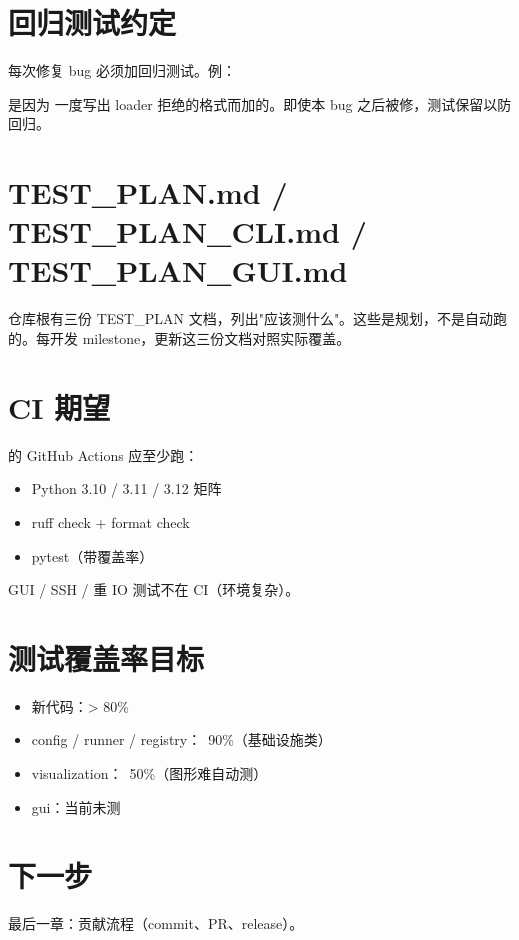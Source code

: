 \section{回归测试约定}

每次修复 bug 必须加回归测试。例：

 是因为  一度写出 loader 拒绝的格式而加的。即使本 bug 之后被修，测试保留以防回归。

\section{TEST\_PLAN.md / TEST\_PLAN\_CLI.md / TEST\_PLAN\_GUI.md}

仓库根有三份 TEST\_PLAN 文档，列出"应该测什么"。这些是规划，不是自动跑的。每开发 milestone，更新这三份文档对照实际覆盖。


\section{CI 期望}

\openbench{} 的 GitHub Actions 应至少跑：

\begin{itemize}
  \item Python 3.10 / 3.11 / 3.12 矩阵
  \item ruff check + format check
  \item pytest（带覆盖率）
\end{itemize}

GUI / SSH / 重 IO 测试不在 CI（环境复杂）。

\section{测试覆盖率目标}

\begin{itemize}
  \item 新代码：> 80\%
  \item config / runner / registry：~90\%（基础设施类）
  \item visualization：~50\%（图形难自动测）
  \item gui：当前未测
\end{itemize}

\section{下一步}

最后一章：贡献流程（commit、PR、release）。
